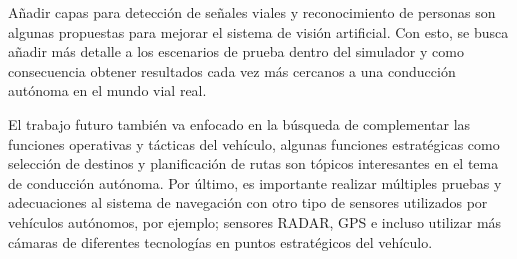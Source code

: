 Añadir capas para detección de señales viales y reconocimiento de personas son algunas propuestas para mejorar el sistema de visión artificial. Con esto, se busca añadir más detalle a los escenarios de prueba dentro del simulador y como consecuencia obtener resultados cada vez más cercanos a una conducción autónoma en el mundo vial real.

El trabajo futuro también va enfocado en la búsqueda de complementar las funciones operativas y tácticas del vehículo, algunas funciones estratégicas como selección de destinos y planificación de rutas son tópicos interesantes en el tema de conducción autónoma. Por último, es importante realizar múltiples pruebas y adecuaciones al sistema de navegación con otro tipo de sensores utilizados por vehículos autónomos, por ejemplo; sensores RADAR, GPS e incluso utilizar más cámaras de diferentes tecnologías en puntos estratégicos del vehículo.
